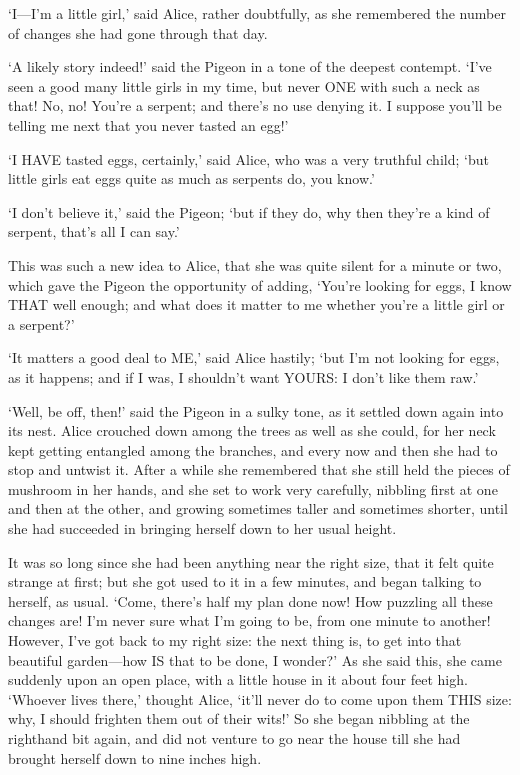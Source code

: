\documentclass[12pt]{book}
\begin{document}
\begin{Parallel}[p]{}{}
{‘I—I’m a little girl,’ said Alice, rather doubtfully, as she remembered the number of changes she had gone through that day.

‘A likely story indeed!’ said the Pigeon in a tone of the deepest contempt. ‘I’ve seen a good many little girls in my time, but never ONE with such a neck as that! No, no! You’re a serpent; and there’s no use denying it. I suppose you’ll be telling me next that you never tasted an egg!’

‘I HAVE tasted eggs, certainly,’ said Alice, who was a very truthful child; ‘but little girls eat eggs quite as much as serpents do, you know.’

‘I don’t believe it,’ said the Pigeon; ‘but if they do, why then they’re a kind of serpent, that’s all I can say.’

This was such a new idea to Alice, that she was quite silent for a minute or two, which gave the Pigeon the opportunity of adding, ‘You’re looking for eggs, I know THAT well enough; and what does it matter to me whether you’re a little girl or a serpent?’

‘It matters a good deal to ME,’ said Alice hastily; ‘but I’m not looking for eggs, as it happens; and if I was, I shouldn’t want YOURS: I don’t like them raw.’

‘Well, be off, then!’ said the Pigeon in a sulky tone, as it settled down again into its nest. Alice crouched down among the trees as well as she could, for her neck kept getting entangled among the branches, and every now and then she had to stop and untwist it. After a while she remembered that she still held the pieces of mushroom in her hands, and she set to work very carefully, nibbling first at one and then at the other, and growing sometimes taller and sometimes shorter, until she had succeeded in bringing herself down to her usual height.

It was so long since she had been anything near the right size, that it felt quite strange at first; but she got used to it in a few minutes, and began talking to herself, as usual. ‘Come, there’s half my plan done now! How puzzling all these changes are! I’m never sure what I’m going to be, from one minute to another! However, I’ve got back to my right size: the next thing is, to get into that beautiful garden—how IS that to be done, I wonder?’ As she said this, she came suddenly upon an open place, with a little house in it about four feet high. ‘Whoever lives there,’ thought Alice, ‘it’ll never do to come upon them THIS size: why, I should frighten them out of their wits!’ So she began nibbling at the righthand bit again, and did not venture to go near the house till she had brought herself down to nine inches high.




}
\end{Parallel}
\end{document}
